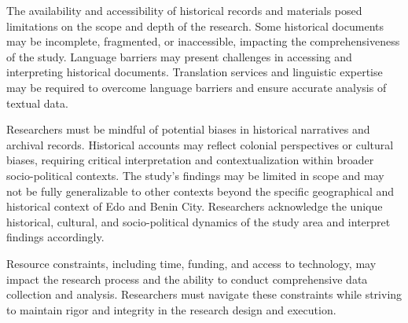 The availability and accessibility of historical records and materials posed limitations on the scope and depth of the research. Some historical documents may be incomplete, fragmented, or inaccessible, impacting the comprehensiveness of the study. Language barriers may present challenges in accessing and interpreting historical documents. Translation services and linguistic expertise may be required to overcome language barriers and ensure accurate analysis of textual data.

Researchers must be mindful of potential biases in historical narratives and archival records. Historical accounts may reflect colonial perspectives or cultural biases, requiring critical interpretation and contextualization within broader socio-political contexts. The study's findings may be limited in scope and may not be fully generalizable to other contexts beyond the specific geographical and historical context of Edo and Benin City. Researchers acknowledge the unique historical, cultural, and socio-political dynamics of the study area and interpret findings accordingly.

Resource constraints, including time, funding, and access to technology, may impact the research process and the ability to conduct comprehensive data collection and analysis. Researchers must navigate these constraints while striving to maintain rigor and integrity in the research design and execution.
